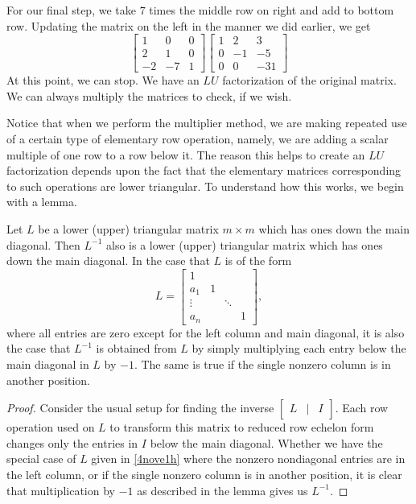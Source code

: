 \documentclass{ximera}
\begin{document}
\begin{example}
\begin{explanation}
For our final step, we take $7$ times the middle row on right and add to bottom row. Updating the matrix on the left in the manner we did earlier, we get
\[
\begin{bmatrix}
1 & 0 & 0 \\
2 & 1 & 0 \\
-2 & -7 & 1
\end{bmatrix} 
\begin{bmatrix}
1 & 2 & 3 \\
0 & -1 & -5 \\
0 & 0 & -31
\end{bmatrix} 
\]
At this point, we can stop. We have an $LU$ factorization of the original matrix.  We can always multiply the matrices to check, if we wish.
\end{explanation}
\end{example}

Notice that when we perform the multiplier method, we are making repeated use of a certain type of elementary row operation, namely, we are adding a scalar multiple of one row to a row below it.  The reason this helps to create an $LU$ factorization depends upon the fact that the elementary matrices corresponding to such operations are lower triangular.  To understand how this works, we begin with a lemma. 

\begin{lemma}\label{lem:multipliermethodtriangularmatrices}
Let $L$ be a lower (upper) triangular matrix $m\times m$
which has ones down the main diagonal. Then $L^{-1}$ also is a lower (upper)
triangular matrix which has ones down the main diagonal. In the case that $L$
is of the form
\begin{equation}\label{4nove1h}
L=
\begin{bmatrix}
1 &  &  &  \\
a_{1} & 1 &  &  \\
\vdots &  & \ddots &  \\
a_{n} &  &  & 1
\end{bmatrix}, 
\end{equation}
where all entries are zero except for the left column and main diagonal, it
is also the case that $L^{-1}$ is obtained from $L$ by simply multiplying each entry below the main diagonal in $L$ by $-1$. The same is true if the single nonzero column is in another position.
\end{lemma}

\begin{proof}Consider the usual setup for finding the inverse $\begin{bmatrix}
L &|& I
\end{bmatrix}$.  Each row operation used on $L$ to transform this matrix to reduced row echelon form changes only the entries in $I$ below the main diagonal. Whether we have the special case of $L$ given in \ref{4nove1h} where the nonzero nondiagonal entries are in the left column, or if the single
nonzero column is in another position, it is clear that multiplication by $-1$ as described in the lemma gives us $L^{-1}$.
\end{proof}
\end{document}
